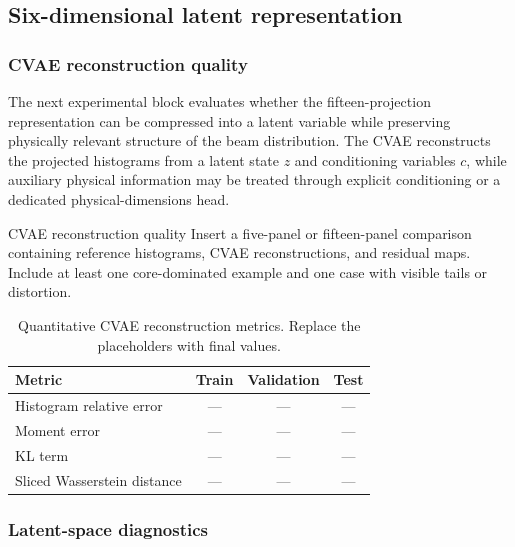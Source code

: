 \subsection{Six-dimensional latent representation}
\label{subsec:results_latent_representation}

\subsubsection{CVAE reconstruction quality}
\label{subsubsec:cvae_reconstruction_quality}

The next experimental block evaluates whether the fifteen-projection representation can be compressed into a latent variable while preserving physically relevant structure of the beam distribution. The CVAE reconstructs the projected histograms from a latent state \(z\) and conditioning variables \(c\), while auxiliary physical information may be treated through explicit conditioning or a dedicated physical-dimensions head.

\placeholderfigure
{CVAE reconstruction quality}
{Insert a five-panel or fifteen-panel comparison containing reference histograms, CVAE reconstructions, and residual maps. Include at least one core-dominated example and one case with visible tails or distortion.}

\begin{table}[H]
\centering
\caption{
Quantitative CVAE reconstruction metrics. Replace the placeholders with final values.
}
\label{tab:cvae_reconstruction_metrics}
\begin{tabular}{lccc}
\toprule
Metric & Train & Validation & Test \\
\midrule
Histogram relative error & --- & --- & --- \\
Moment error & --- & --- & --- \\
KL term & --- & --- & --- \\
Sliced Wasserstein distance & --- & --- & --- \\
\bottomrule
\end{tabular}
\end{table}

\subsubsection{Latent-space diagnostics}
\label{subsubsec:latent_space_diagnostics}

